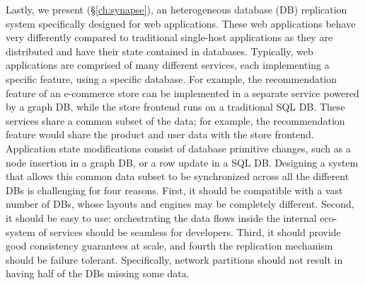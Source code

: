 Lastly, we present \synapse (\S\ref{ch:synapse}), an heterogeneous database (DB)
replication system specifically designed for web applications. These web
applications behave very differently compared to traditional single-host
applications as they are distributed and have their state contained in
databases. Typically, web applications are comprised of many different
services, each implementing a specific feature, using a specific database.
For example, the recommendation feature of an e-commerce store can be
implemented in a separate service powered by a graph DB, while the store
frontend runs on a traditional SQL DB. These services share a common subset
of the data; for example, the recommendation feature would share the product
and user data with the store frontend.
Application state modifications consist of database primitive changes, such as a
node insertion in a graph DB, or a row update in a SQL DB. 
Designing a system that allows this common data subset to be synchronized across
all the different DBs is challenging for four reasons. First, it should be
compatible with a vast number of DBs, whose layouts and engines may be
completely different. Second, it should be easy to use: orchestrating the data
flows inside the internal eco-system of services should be seamless for developers.
Third, it should provide good consistency guarantees at scale, and fourth
the replication mechanism should be failure tolerant. Specifically, network partitions
should not result in having half of the DBs missing some data.

